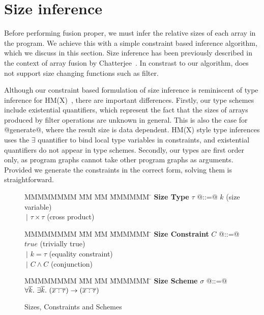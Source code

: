 \section{Size inference}
Before performing fusion proper, we must infer the relative sizes of each array in the program. We achieve this with a simple constraint based inference algorithm, which we discuss in this section. Size inference has been previously described in the context of array fusion by Chatterjee~\cite{chatterjee1991size}. In constrast to our algorithm, \cite{chatterjee1991size} does not support size changing functions such as filter.

Although our constraint based formulation of size inference is reminiscent of type inference for HM(X)~\cite{odersky1999type}, there are important differences. Firstly, our type schemes include existential quantifiers, which represent the fact that the sizes of arrays produced by filter operations are unknown in general. This is also the case for @generate@, where the result size is data dependent. HM(X) style type inferences uses the $\exists$ quantifier to bind local type variables in constraints, and existential quantifiers do not appear in type schemes. Secondly, our types are first order only, as program graphs cannot take other program graphs as arguments. Provided we generate the constraints in the correct form, solving them is straightforward.


\begin{figure}
\begin{tabbing}
MMMMMMMM \= MM  \= MM \= MMMMMM \= \kill
\textbf{Size Type}
\> $\tau$   \> @::=@  \> $k$                  \> (size variable)       \\
\>          \> $~|$   \> $\tau \times \tau$   \> (cross product)
\end{tabbing}

\begin{tabbing}
MMMMMMMM \= MM  \= MM \= MMMMMM \= \kill
\textbf{Size Constraint}
\> $C$      \> @::=@  \> $true$               \> (trivially true)      \\
\>          \> $~|$   \> $k = \tau$           \> (equality constraint) \\
\>          \> $~|$   \> $C \wedge C$         \> (conjunction)
\end{tabbing}

\begin{tabbing}
MMMMMMMM \= MM  \= MM \= MMMMMM \= \kill
\textbf{Size Scheme}
\> $\sigma$ \> @::=@  
        \> $\forall \overline{k}.~ \exists \overline{k}.~ (\overline{ x : \tau }) \to (\overline{x : \tau})$
\end{tabbing}

\caption{Sizes, Constraints and Schemes}
\label{f:constraints}
\end{figure}


